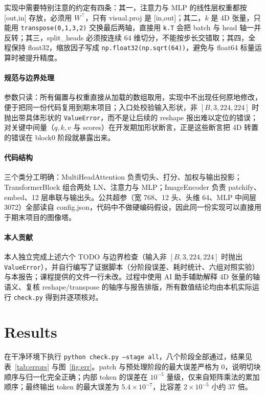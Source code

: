 \documentclass[a4paper,12pt]{article}
\begin{document}
实现中需要特别注意的约定有四条：其一，注意力与 MLP 的线性层权重都按 [out,in] 存放，必须用 $W^{\top}$，只有 visual.proj 是 [in,out]；其二，$k$ 是 4D 张量，只能用 \texttt{transpose(0,1,3,2)} 交换最后两轴，直接用 \texttt{k.T} 会把 batch 与 head 轴一并反转；其三，split\_heads 必须按连续 64 维切分，不能按步长交错取；其四，全程保持 float32，缩放因子写成 \texttt{np.float32(np.sqrt(64))}，避免与 float64 标量运算时被提升精度。

\paragraph{规范与边界处理}
参数只读：所有偏置与权重直接从加载的数组取用，实现中不出现任何原地修改，便于把同一份代码复用到期末项目；入口处校验输入形状，非 $[B,3,224,224]$ 时抛出带具体形状的 \texttt{ValueError}，而不是让后续的 reshape 报出难以定位的错误；对关键中间量（$q,k,v$ 与 scores）在开发期加形状断言，正是这些断言把 4D 转置的错误在 block0 阶段就暴露出来。

\paragraph{代码结构}
三个类分工明确：MultiHeadAttention 负责切头、打分、加权与输出投影；TransformerBlock 组合两处 LN、注意力与 MLP；ImageEncoder 负责 patchify、embed、12 层串联与输出头。公共超参（宽 768、12 头、头维 64、MLP 中间层 3072）全部读自 config.json，代码中不做硬编码假设，因此同一份实现可以直接用于期末项目的图像塔。

\paragraph{本人贡献}
本人独立完成上述六个 TODO 与边界检查（输入非 $[B,3,224,224]$ 时抛出 \texttt{ValueError}），并自行编写了证据脚本（分阶段误差、耗时统计、六组对照实验）与本报告；课程提供的文件一行未改。过程中使用 AI 助手辅助解释 4D 张量的轴语义、复核 reshape/transpose 的轴序与报告排版，所有数值结论均由本机实际运行 \texttt{check.py} 得到并逐项核对。

\section{Results}

在干净环境下执行 \texttt{python check.py --stage all}，八个阶段全部通过，结果见表~\ref{tab:errors} 与图~\ref{fig:err}。patch 与预处理阶段的最大误差严格为 0，说明切块顺序与归一化完全正确；内部 token 的误差在 $10^{-5}$ 量级，仅来自矩阵乘法的累加顺序；最终输出 token 的最大误差为 $5.4\times10^{-7}$，比容差 $2\times10^{-5}$ 小约 37 倍。
\end{document}

